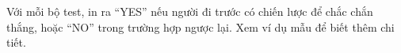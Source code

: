 Với mỗi bộ test, in ra “YES” nếu người đi trước có chiến lược để chắc chắn thắng, hoặc “NO” trong trường hợp ngược lại. Xem ví dụ mẫu để biết thêm chi tiết.   

\